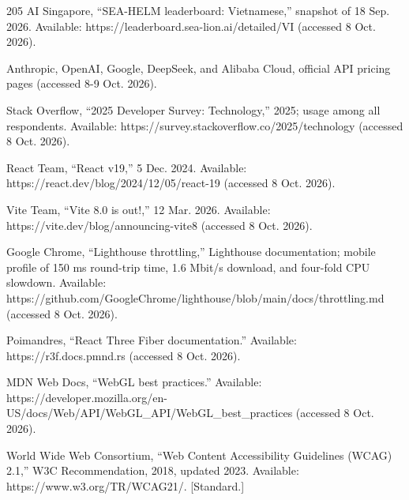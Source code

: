\begin{thebibliography}{205}
 AI Singapore, ``SEA-HELM leaderboard: Vietnamese,'' snapshot of 18 Sep. 2026. Available: https:/\allowbreak{}/\allowbreak{}leaderboard.\allowbreak{}sea-\allowbreak{}lion.\allowbreak{}ai/\allowbreak{}detailed/\allowbreak{}VI (accessed 8 Oct. 2026).

 Anthropic, OpenAI, Google, DeepSeek, and Alibaba Cloud, official API pricing pages (accessed 8-9 Oct. 2026).

 Stack Overflow, ``2025 Developer Survey: Technology,'' 2025; usage among all respondents. Available: https:/\allowbreak{}/\allowbreak{}survey.\allowbreak{}stackoverflow.\allowbreak{}co/\allowbreak{}2025/\allowbreak{}technology (accessed 8 Oct. 2026).

 React Team, ``React v19,'' 5 Dec. 2024. Available: https:/\allowbreak{}/\allowbreak{}react.\allowbreak{}dev/\allowbreak{}blog/\allowbreak{}2024/\allowbreak{}12/\allowbreak{}05/\allowbreak{}react-\allowbreak{}19 (accessed 8 Oct. 2026).

 Vite Team, ``Vite 8.0 is out!,'' 12 Mar. 2026. Available: https:/\allowbreak{}/\allowbreak{}vite.\allowbreak{}dev/\allowbreak{}blog/\allowbreak{}announcing-\allowbreak{}vite8 (accessed 8 Oct. 2026).

 Google Chrome, ``Lighthouse throttling,'' Lighthouse documentation; mobile profile of 150 ms round-trip time, 1.6 Mbit/s download, and four-fold CPU slowdown. Available: https:/\allowbreak{}/\allowbreak{}github.\allowbreak{}com/\allowbreak{}GoogleChrome/\allowbreak{}lighthouse/\allowbreak{}blob/\allowbreak{}main/\allowbreak{}docs/\allowbreak{}throttling.\allowbreak{}md (accessed 8 Oct. 2026).

 Poimandres, ``React Three Fiber documentation.\allowbreak{}'' Available: https:/\allowbreak{}/\allowbreak{}r3f.\allowbreak{}docs.\allowbreak{}pmnd.\allowbreak{}rs (accessed 8 Oct. 2026).

 MDN Web Docs, ``WebGL best practices.'' Available: https:/\allowbreak{}/\allowbreak{}developer.\allowbreak{}mozilla.\allowbreak{}org/\allowbreak{}en-\allowbreak{}US/\allowbreak{}docs/\allowbreak{}Web/\allowbreak{}API/\allowbreak{}WebGL\_\allowbreak{}API/\allowbreak{}WebGL\_\allowbreak{}best\_\allowbreak{}practices (accessed 8 Oct. 2026).

 World Wide Web Consortium, ``Web Content Accessibility Guidelines (WCAG) 2.1,'' W3C Recommendation, 2018, updated 2023. Available: https:/\allowbreak{}/\allowbreak{}www.\allowbreak{}w3.\allowbreak{}org/\allowbreak{}TR/\allowbreak{}WCAG21/\allowbreak{}. [Standard.]


\end{thebibliography}
